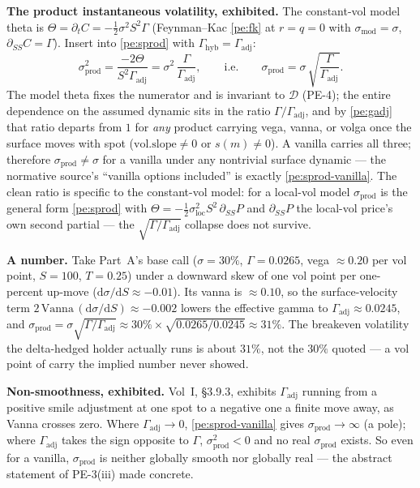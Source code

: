 \documentclass[11pt,a4paper]{article}
\newcommand{\dd}{\mathrm{d}}
\newcommand{\Vanna}{\mathrm{Vanna}}
\newcommand{\Gadj}{\Gamma_{\mathrm{adj}}}
\newcommand{\smod}{\sigma_{\mathrm{mod}}}
\newcommand{\sprod}{\sigma_{\mathrm{prod}}}
\newcommand{\Ghyb}{\Gamma_{\mathrm{hyb}}}
\newcommand{\volslope}{\mathrm{vol.slope}}
\begin{document}
\textbf{The product instantaneous volatility, exhibited.} The constant-vol model
theta is $\Theta = \partial_t C = -\tfrac12\sigma^2 S^2\Gamma$ (Feynman--Kac
\eqref{pe:fk} at $r=q=0$ with $\smod=\sigma$, $\partial_{SS}C=\Gamma$). Insert
into \eqref{pe:sprod} with $\Ghyb=\Gadj$:
\begin{equation}\label{pe:sprod-vanilla}
  \sprod^2 = \frac{-2\Theta}{S^2\Gadj}
           = \sigma^2\,\frac{\Gamma}{\Gadj},
  \qquad\text{i.e.}\qquad
  \sprod = \sigma\,\sqrt{\frac{\Gamma}{\Gadj}} .
\end{equation}
The model theta fixes the numerator and is invariant to $\mathcal{D}$ (PE-4);
the entire dependence on the assumed dynamic sits in the ratio
$\Gamma/\Gadj$, and by \eqref{pe:gadj} that ratio departs from $1$ for
\emph{any} product carrying vega, vanna, or volga once the surface moves with
spot ($\volslope\neq0$ or $s(m)\neq0$). A vanilla carries all three; therefore
$\sprod\neq\sigma$ for a vanilla under any nontrivial surface dynamic --- the
normative source's ``vanilla options included'' is exactly \eqref{pe:sprod-vanilla}.
The clean ratio is specific to the constant-vol model: for a local-vol model
$\sprod$ is the general form \eqref{pe:sprod} with
$\Theta=-\tfrac12\sigma_{\mathrm{loc}}^2 S^2\,\partial_{SS}P$ and
$\partial_{SS}P$ the local-vol price's own second partial --- the
$\sqrt{\Gamma/\Gadj}$ collapse does not survive.

\textbf{A number.} Take Part~A's base call ($\sigma=30\%$, $\Gamma=0.0265$, vega
$\approx0.20$ per vol point, $S=100$, $T=0.25$) under a downward skew of one vol
point per one-percent up-move ($\dd\sigma/\dd S\approx-0.01$). Its vanna is
$\approx0.10$, so the surface-velocity term
$2\,\Vanna\,(\dd\sigma/\dd S)\approx-0.002$ lowers the effective gamma to
$\Gadj\approx0.0245$, and
$\sprod=\sigma\sqrt{\Gamma/\Gadj}\approx30\%\times\sqrt{0.0265/0.0245}\approx31\%$.
The breakeven volatility the delta-hedged holder actually runs is about $31\%$,
not the $30\%$ quoted --- a vol point of carry the implied number never showed.

\textbf{Non-smoothness, exhibited.} Vol~I, \S3.9.3, exhibits $\Gadj$ running from a
positive smile adjustment at one spot to a negative one a finite move away, as
Vanna crosses zero. Where $\Gadj\to0$, \eqref{pe:sprod-vanilla}
gives $\sprod\to\infty$ (a pole); where $\Gadj$ takes the sign opposite to
$\Gamma$, $\sprod^2<0$ and no real $\sprod$ exists. So even for a vanilla,
$\sprod$ is neither globally smooth nor globally real --- the abstract statement
of PE-3(iii) made concrete.
\end{document}
